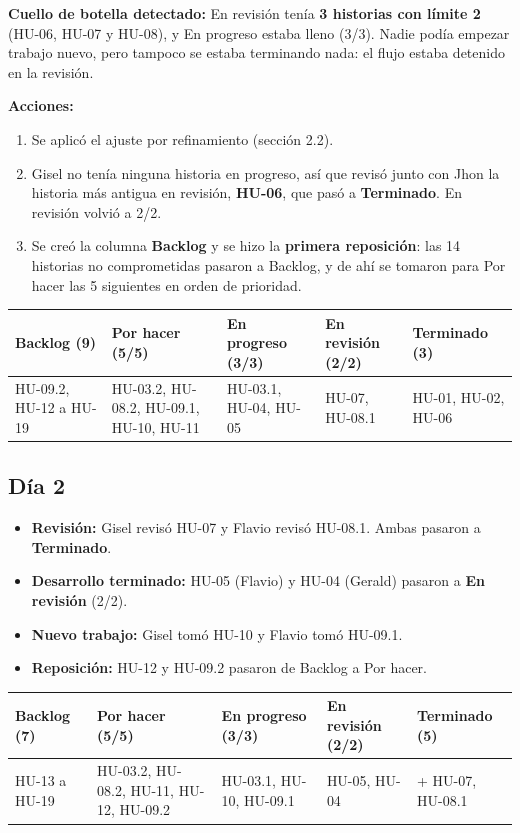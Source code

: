 \documentclass[11pt,a4paper]{article}
\newcommand{\dia}[1]{\subsection*{#1}\addcontentsline{toc}{subsection}{#1}}
\begin{document}
\textbf{Cuello de botella detectado:} En revisión tenía \textbf{3 historias con límite 2} (HU-06, HU-07 y HU-08), y En progreso estaba lleno (3/3). Nadie podía empezar trabajo nuevo, pero tampoco se estaba terminando nada: el flujo estaba detenido en la revisión.

\textbf{Acciones:}
\begin{enumerate}
  \item Se aplicó el ajuste por refinamiento (sección 2.2).
  \item Gisel no tenía ninguna historia en progreso, así que revisó junto con Jhon la historia más antigua en revisión, \textbf{HU-06}, que pasó a \textbf{Terminado}. En revisión volvió a 2/2.
  \item Se creó la columna \textbf{Backlog} y se hizo la \textbf{primera reposición}: las 14 historias no comprometidas pasaron a Backlog, y de ahí se tomaron para Por hacer las 5 siguientes en orden de prioridad.
\end{enumerate}

\begin{center}\footnotesize
\begin{tabularx}{\linewidth}{Y Y Y Y Y}
\toprule
\textbf{Backlog (9)} & \textbf{Por hacer (5/5)} & \textbf{En progreso (3/3)} & \textbf{En revisión (2/2)} & \textbf{Terminado (3)} \\
\midrule
HU-09.2, HU-12 a HU-19 & HU-03.2, HU-08.2, HU-09.1, HU-10, HU-11 & HU-03.1, HU-04, HU-05 & HU-07, HU-08.1 & HU-01, HU-02, HU-06 \\
\bottomrule
\end{tabularx}
\end{center}

\dia{Día 2}

\begin{itemize}
  \item \textbf{Revisión:} Gisel revisó HU-07 y Flavio revisó HU-08.1. Ambas pasaron a \textbf{Terminado}.
  \item \textbf{Desarrollo terminado:} HU-05 (Flavio) y HU-04 (Gerald) pasaron a \textbf{En revisión} (2/2).
  \item \textbf{Nuevo trabajo:} Gisel tomó HU-10 y Flavio tomó HU-09.1.
  \item \textbf{Reposición:} HU-12 y HU-09.2 pasaron de Backlog a Por hacer.
\end{itemize}

\begin{center}\footnotesize
\begin{tabularx}{\linewidth}{Y Y Y Y Y}
\toprule
\textbf{Backlog (7)} & \textbf{Por hacer (5/5)} & \textbf{En progreso (3/3)} & \textbf{En revisión (2/2)} & \textbf{Terminado (5)} \\
\midrule
HU-13 a HU-19 & HU-03.2, HU-08.2, HU-11, HU-12, HU-09.2 & HU-03.1, HU-10, HU-09.1 & HU-05, HU-04 & + HU-07, HU-08.1 \\
\bottomrule
\end{tabularx}
\end{center}
\end{document}
